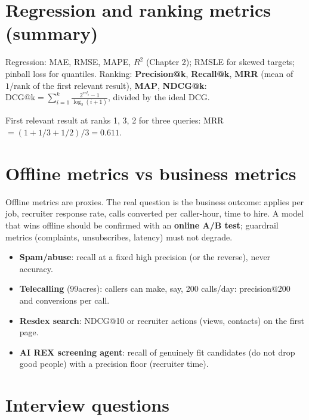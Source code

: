 \section{Regression and ranking metrics (summary)}
Regression: MAE, RMSE, MAPE, $R^2$ (Chapter 2); RMSLE for skewed targets; pinball loss for quantiles.
Ranking: \textbf{Precision@k}, \textbf{Recall@k}, \textbf{MRR} (mean of $1/\text{rank}$ of the first relevant result),
\textbf{MAP}, \textbf{NDCG@k}: $\text{DCG@k} = \sum_{i=1}^k\frac{2^{rel_i} - 1}{\log_2(i+1)}$, divided by the ideal DCG.
\begin{example}[: MRR]
First relevant result at ranks 1, 3, 2 for three queries: MRR $= (1 + 1/3 + 1/2)/3 = 0.611$.
\end{example}

\section{Offline metrics vs business metrics}
Offline metrics are proxies. The real question is the business outcome: applies per job, recruiter response rate, calls converted
per caller-hour, time to hire. A model that wins offline should be confirmed with an \textbf{online A/B test}; guardrail metrics
(complaints, unsubscribes, latency) must not degrade.

\begin{practical}
\begin{itemize}
\item \textbf{Spam/abuse}: recall at a fixed high precision (or the reverse), never accuracy.
\item \textbf{Telecalling} (99acres): callers can make, say, 200 calls/day: precision@200 and conversions per call.
\item \textbf{Resdex search}: NDCG@10 or recruiter actions (views, contacts) on the first page.
\item \textbf{AI REX screening agent}: recall of genuinely fit candidates (do not drop good people) with a precision floor
  (recruiter time).
\end{itemize}
\end{practical}

\section{Interview questions}

